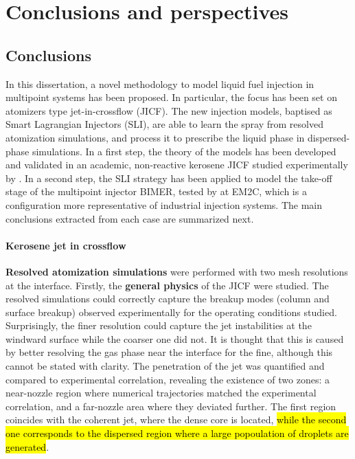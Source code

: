 \chapter{Conclusions and perspectives}

\section*{Conclusions}

In this dissertation, a novel methodology to model liquid fuel injection in multipoint systems has been proposed. In particular, the focus has been set on atomizers type jet-in-crossflow (JICF). The new injection models, baptised as Smart Lagrangian Injectors (SLI), are able to learn the spray from resolved atomization simulations, and process it to prescribe the liquid phase in dispersed-phase simulations. In a first step, the theory of the models has been developed and validated in an academic, non-reactive kerosene JICF studied experimentally by . In a second step, the SLI strategy has been applied to model the take-off stage of the multipoint injector BIMER, tested by  at EM2C, which is a configuration more representative of industrial injection systems. The main conclusions extracted from each case are summarized next.


\subsubsection*{Kerosene jet in crossflow}

\textbf{Resolved atomization simulations} were performed with two mesh resolutions at the interface. Firstly, the \textbf{general physics} of the JICF were studied. The resolved simulations could correctly capture the breakup modes (column and surface breakup) observed experimentally for the operating conditions studied. Surprisingly, the finer resolution could capture the jet instabilities at the windward surface while the coarser one did not. It is thought that this is caused by better resolving the gas phase near the interface for the fine, {although this cannot be stated with clarity}. The penetration of the jet was quantified and compared to experimental correlation, revealing the existence of two zones: a near-nozzle region where numerical trajectories matched the experimental correlation, and a far-nozzle area where they deviated further. The first region coincides with the coherent jet, where the dense core is located, \hl{while the second one corresponds to the dispersed region where a large popoulation of droplets are generated}.


